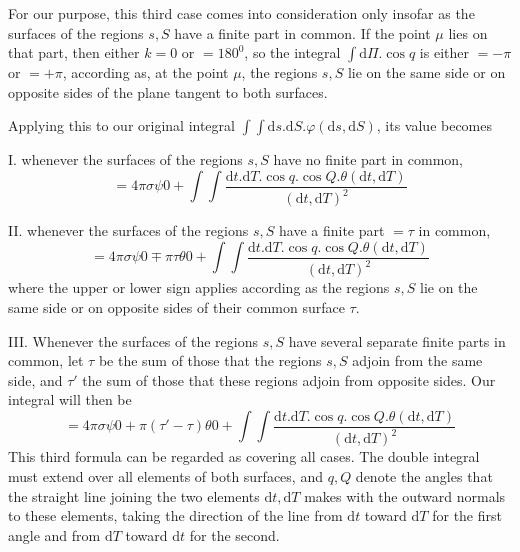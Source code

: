 For our purpose, this third case comes into consideration only insofar as the surfaces of the regions $s,S$ have a finite part in common. If the point $\mu$ lies on that part, then either $k=0$ or $=180^0$, so the integral $\int\mathrm{d}\Pi.\cos q$ is either $=-\pi$ or $=+\pi$, according as, at the point $\mu$, the regions $s,S$ lie on the same side or on opposite sides of the plane tangent to both surfaces.

Applying this to our original integral $\int\int\mathrm{d}s.\mathrm{d}S.\varphi(\mathrm{d}s,\mathrm{d}S)$, its value becomes

I. whenever the surfaces of the regions $s,S$ have no finite part in common,
\[
=4\pi\sigma\psi0+\int\int\frac{\mathrm{d}t.\mathrm{d}T.\cos q.\cos Q.\theta(\mathrm{d}t,\mathrm{d}T)}{(\mathrm{d}t,\mathrm{d}T)^2}
\]

II. whenever the surfaces of the regions $s,S$ have a finite part $=\tau$ in common,
\[
=4\pi\sigma\psi0\mp\pi\tau\theta0+\int\int\frac{\mathrm{d}t.\mathrm{d}T.\cos q.\cos Q.\theta(\mathrm{d}t,\mathrm{d}T)}{(\mathrm{d}t,\mathrm{d}T)^2}
\]
where the upper or lower sign applies according as the regions $s,S$ lie on the same side or on opposite sides of their common surface $\tau$.

III. Whenever the surfaces of the regions $s,S$ have several separate finite parts in common, let $\tau$ be the sum of those that the regions $s,S$ adjoin from the same side, and $\tau'$ the sum of those that these regions adjoin from opposite sides. Our integral will then be
\[
=4\pi\sigma\psi0+\pi(\tau'-\tau)\theta0+\int\int\frac{\mathrm{d}t.\mathrm{d}T.\cos q.\cos Q.\theta(\mathrm{d}t,\mathrm{d}T)}{(\mathrm{d}t,\mathrm{d}T)^2}
\]
This third formula can be regarded as covering all cases. The double integral must extend over all elements of both surfaces, and $q,Q$ denote the angles that the straight line joining the two elements $\mathrm{d}t,\mathrm{d}T$ makes with the outward normals to these elements, taking the direction of the line from $\mathrm{d}t$ toward $\mathrm{d}T$ for the first angle and from $\mathrm{d}T$ toward $\mathrm{d}t$ for the second.


